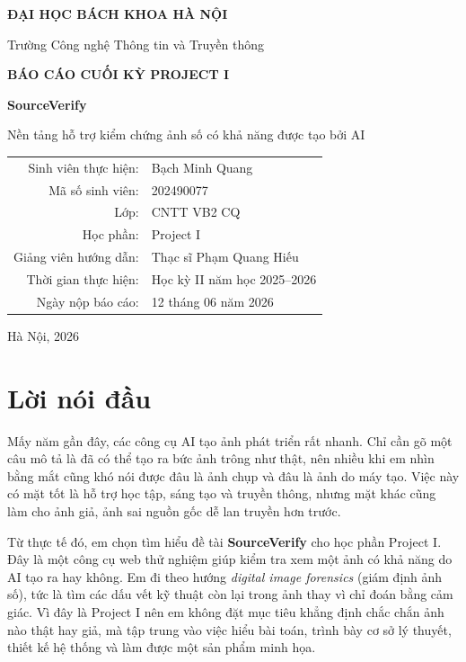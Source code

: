 \documentclass[14pt,a4paper,oneside]{report}
\begin{document}
\begin{titlepage}
\centering
{\Large\bfseries ĐẠI HỌC BÁCH KHOA HÀ NỘI\par}
\vspace{0.35cm}
{\large Trường Công nghệ Thông tin và Truyền thông\par}
\vspace{1.8cm}
{\Large\bfseries BÁO CÁO CUỐI KỲ PROJECT I\par}
\vspace{0.8cm}
{\Huge\bfseries SourceVerify\par}
\vspace{0.35cm}
{\Large Nền tảng hỗ trợ kiểm chứng ảnh số có khả năng được tạo bởi AI\par}
\vspace{1.6cm}
\begin{tabular}{rl}
Sinh viên thực hiện: & Bạch Minh Quang \\
Mã số sinh viên: & 202490077 \\
Lớp: & CNTT VB2 CQ \\
Học phần: & Project I \\
Giảng viên hướng dẫn: & Thạc sĩ Phạm Quang Hiếu \\
Thời gian thực hiện: & Học kỳ II năm học 2025--2026 \\
Ngày nộp báo cáo: & 12 tháng 06 năm 2026 \\
\end{tabular}
\vfill
{\large Hà Nội, 2026\par}
\end{titlepage}

\chapter*{Lời nói đầu}
Mấy năm gần đây, các công cụ AI tạo ảnh phát triển rất nhanh. Chỉ cần gõ một câu mô tả là đã có thể tạo ra bức ảnh trông như thật, nên nhiều khi em nhìn bằng mắt cũng khó nói được đâu là ảnh chụp và đâu là ảnh do máy tạo. Việc này có mặt tốt là hỗ trợ học tập, sáng tạo và truyền thông, nhưng mặt khác cũng làm cho ảnh giả, ảnh sai nguồn gốc dễ lan truyền hơn trước.

Từ thực tế đó, em chọn tìm hiểu đề tài \textbf{SourceVerify} cho học phần Project I. Đây là một công cụ web thử nghiệm giúp kiểm tra xem một ảnh có khả năng do AI tạo ra hay không. Em đi theo hướng \textit{digital image forensics} (giám định ảnh số), tức là tìm các dấu vết kỹ thuật còn lại trong ảnh thay vì chỉ đoán bằng cảm giác. Vì đây là Project I nên em không đặt mục tiêu khẳng định chắc chắn ảnh nào thật hay giả, mà tập trung vào việc hiểu bài toán, trình bày cơ sở lý thuyết, thiết kế hệ thống và làm được một sản phẩm minh họa.
\end{document}
